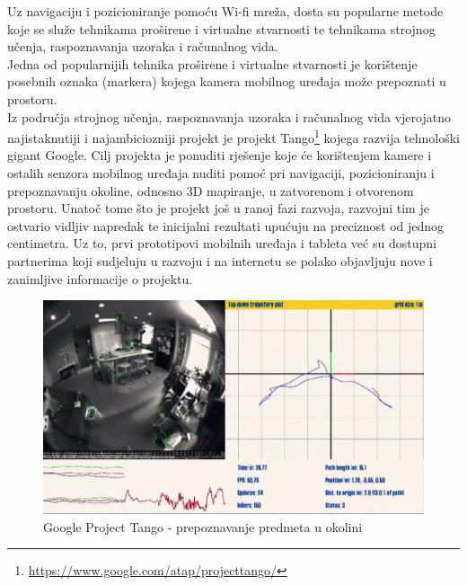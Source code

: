 Uz navigaciju i pozicioniranje pomoću Wi-fi mreža, dosta su popularne metode koje se služe tehnikama proširene i virtualne stvarnosti te tehnikama strojnog učenja, raspoznavanja uzoraka i računalnog vida.
\\
Jedna od popularnijih tehnika proširene  i virtualne stvarnosti je korištenje posebnih oznaka (markera) kojega kamera mobilnog uređaja može prepoznati u prostoru.
\\

Iz područja strojnog učenja, raspoznavanja uzoraka i računalnog vida vjerojatno najistaknutiji i najambiciozniji projekt je projekt Tango\footnote{\url{https://www.google.com/atap/projecttango/}} kojega razvija tehnološki gigant Google. 
Cilj projekta je ponuditi rješenje koje će korištenjem kamere i ostalih senzora mobilnog uređaja nuditi pomoć pri navigaciji, pozicioniranju i prepoznavanju okoline, odnosno 3D mapiranje, u zatvorenom i otvorenom prostoru. 
Unatoč tome što je projekt još u ranoj fazi razvoja, razvojni tim je ostvario vidljiv napredak te inicijalni rezultati upućuju na preciznost od jednog centimetra. 
Uz to, prvi prototipovi mobilnih uređaja i tableta već su dostupni partnerima koji sudjeluju u razvoju i na internetu se polako objavljuju nove i zanimljive informacije o projektu. 

\begin{figure}[H]
    \centering
    \includegraphics[scale=0.24]{pictures/tango1}
    \caption{Google Project Tango - prepoznavanje predmeta u okolini}
\end{figure}

